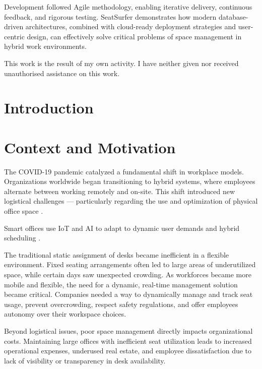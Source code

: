 \documentclass[12pt,a4paper]{report} %
\begin{document}
Development followed Agile methodology, enabling iterative delivery, continuous feedback, and rigorous testing. SeatSurfer demonstrates how modern database-driven architectures, combined with cloud-ready deployment strategies and user-centric design, can effectively solve critical problems of space management in hybrid work environments.

This work is the result of my own activity. I have neither given nor received
unauthorised assistance on this work.

\vspace{0.5cm}

\tableofcontents
\newpage

\section*{Introduction}

\section*{Context and Motivation}

The COVID-19 pandemic catalyzed a fundamental shift in workplace models. Organizations worldwide began transitioning to hybrid systems, where employees alternate between working remotely and on-site. This shift introduced new logistical challenges — particularly regarding the use and optimization of physical office space \cite{baker2021hybrid}.

Smart offices use IoT and AI to adapt to dynamic user demands and hybrid scheduling \cite{nayyar2021smart}.

The traditional static assignment of desks became inefficient in a flexible environment. Fixed seating arrangements often led to large areas of underutilized space, while certain days saw unexpected crowding. As workforces became more mobile and flexible, the need for a dynamic, real-time management solution became critical. Companies needed a way to dynamically manage and track seat usage, prevent overcrowding, respect safety regulations, and offer employees autonomy over their workspace choices.

Beyond logistical issues, poor space management directly impacts organizational costs. Maintaining large offices with inefficient seat utilization leads to increased operational expenses, underused real estate, and employee dissatisfaction due to lack of visibility or transparency in desk availability.
\end{document}
